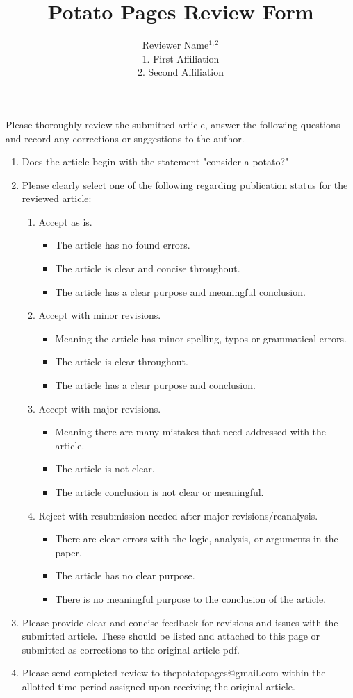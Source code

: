 \documentclass[11pt]{article}
\title{Potato Pages Review Form}
\author{Reviewer Name$^{1,2}$\\ \scriptsize{1. First Affiliation} \\ \scriptsize{2. Second Affiliation}}
\date{}
\begin{document}
\maketitle
\thispagestyle{fancy}

Please thoroughly review the submitted article, answer the following questions and record any corrections or suggestions to the author.

\begin{enumerate}
	\item Does the article begin with the statement "consider a potato?"
	\item Please clearly select one of the following regarding publication status for the reviewed article:
	\begin{enumerate}
		\item Accept as is.
		\begin{itemize}
			\item The article has no found errors.
			\item The article is clear and concise throughout.
			\item The article has a clear purpose and meaningful conclusion.
		\end{itemize}
		\item Accept with minor revisions.
		\begin{itemize}
			\item Meaning the article has minor spelling, typos or grammatical errors.
			\item The article is clear throughout.
			\item The article has a clear purpose and conclusion.
		\end{itemize}
		\item Accept with major revisions.
		\begin{itemize}
			\item Meaning there are many mistakes that need addressed with the article.
			\item The article is not clear.
			\item The article conclusion is not clear or meaningful.
		\end{itemize}
		\item Reject with resubmission needed after major revisions/reanalysis.
		\begin{itemize}
			\item There are clear errors with the logic, analysis, or arguments in the paper.
			\item The article has no clear purpose.
			\item There is no meaningful purpose to the conclusion of the article.
		\end{itemize}
	\end{enumerate}
	\item Please provide clear and concise feedback for revisions and issues with the submitted article. These should be listed and attached to this page or submitted as corrections to the original article pdf.
	\item Please send completed review to thepotatopages@gmail.com within the allotted time period assigned upon receiving the original article.
\end{enumerate}
\end{document}

